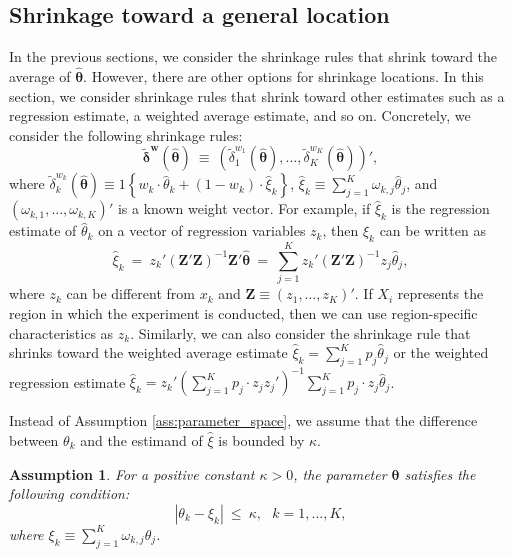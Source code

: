 \documentclass[12pt,a4paper]{article}
\newtheorem{Assumption}{Assumption}
\begin{document}
\subsection{Shrinkage toward a general location}\label{SubSec:reg}
In the previous sections, we consider the shrinkage rules that shrink toward the average of $\hat{\bm{\theta}}$. However, there are other options for shrinkage locations. In this section, we consider shrinkage rules that shrink toward other estimates such as a regression estimate, a weighted average estimate, and so on. Concretely, we consider the following shrinkage rules:
\begin{equation}
\tilde{\bm{\delta}}^{\bm{w}}(\hat{\bm{\theta}}) \ \equiv \ \left( \tilde{\delta}^{w_1}_{1}(\hat{\bm{\theta}}), \ldots, \tilde{\delta}^{w_K}_{K}(\hat{\bm{\theta}}) \right)', \label{shrinkage_rule_reg}
\end{equation}
where $\tilde{\delta}^{w_k}_{k}(\hat{\bm{\theta}}) \equiv 1 \left\{ w_k \cdot \hat{\theta}_k + (1-w_k) \cdot \hat{\xi}_k \right\}$, $\hat{\xi}_k \equiv \sum_{j=1}^K \omega_{k,j} \hat{\theta}_j$, and $(\omega_{k,1}, \ldots, \omega_{k,K})'$ is a known weight vector. For example, if $\hat{\xi}_k$ is the regression estimate of $\hat{\theta}_k$ on a vector of regression variables $z_k$, then $\hat{\xi}_k$ can be written as
\[
\hat{\xi}_k \ = \ z_k' \left( \bm{Z}'\bm{Z} \right)^{-1} \bm{Z}' \hat{\bm{\theta}} \ = \ \sum_{j=1}^K z_k' \left( \bm{Z}'\bm{Z} \right)^{-1} z_j \hat{\theta}_j,
\]
where $z_k$ can be different from $x_k$ and $\bm{Z} \equiv \left( z_1, \ldots, z_K \right)'$. If $X_i$ represents the region in which the experiment is conducted, then we can use region-specific characteristics as $z_k$. Similarly, we can also consider the shrinkage rule that shrinks toward the weighted average estimate $\hat{\xi}_k = \sum_{j=1}^K p_j \hat{\theta}_j$ or the weighted regression estimate $\hat{\xi}_k = z_k' \left( \sum_{j=1}^K p_j \cdot z_j z_j' \right)^{-1}  \sum_{j=1}^K p_j \cdot z_j \hat{\theta}_j$.

Instead of Assumption \ref{ass:parameter_space}, we assume that the difference between $\theta_k$ and the estimand of $\hat{\xi}$ is bounded by $\kappa$.

\begin{Assumption}\label{ass:parameter_space_reg}
For a positive constant $\kappa > 0$, the parameter $\bm{\theta}$ satisfies the following condition:
$$
\left| \theta_k - \xi_k \right| \ \leq \ \kappa, \ \ \ k = 1, \ldots, K,
$$
where $\xi_k \equiv \sum_{j=1}^K \omega_{k,j} \theta_j$.
\end{Assumption}
\end{document}
